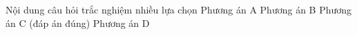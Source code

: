 
\begin{ex}%
Nội dung câu hỏi trắc nghiệm nhiều lựa chọn
\choice
{Phương án A}
{Phương án B}
{\True Phương án C (đáp án đúng)}
{Phương án D}
\end{ex}
